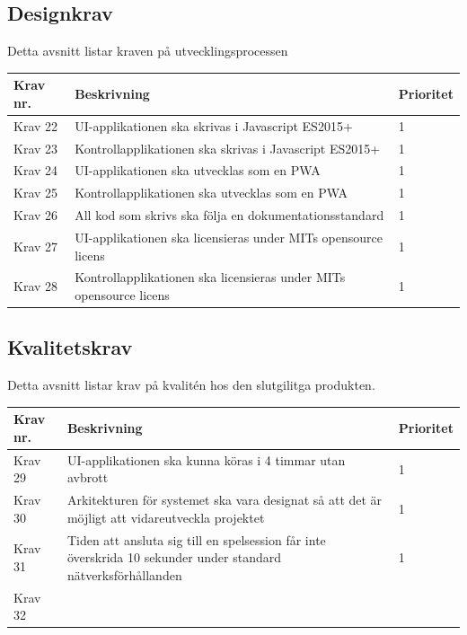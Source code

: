 \documentclass[10pt]{article}
\begin{document}
	\subsection{Designkrav}
	Detta avsnitt listar kraven på utvecklingsprocessen
	
	\begin{tabular}{| p{2cm} | p{8cm} | p{2cm}|}
		\hline
		\textbf{Krav nr.} & \textbf{Beskrivning} & \textbf{Prioritet} \\ \hline
		
		Krav 22 & UI-applikationen ska skrivas i Javascript ES2015+ & 1 \\ \hline
		Krav 23 & Kontrollapplikationen ska skrivas i Javascript ES2015+ & 1 \\ \hline
		Krav 24 & UI-applikationen ska utvecklas som en PWA & 1 \\ \hline
		Krav 25 & Kontrollapplikationen ska utvecklas som en PWA & 1 \\ \hline
		Krav 26 & All kod som skrivs ska följa en dokumentationsstandard & 1 \\ \hline
		Krav 27 & UI-applikationen ska licensieras under MITs opensource licens & 1 \\ \hline
		Krav 28 & Kontrollapplikationen ska licensieras under MITs opensource licens & 1 \\ \hline
	\end{tabular}

	\subsection{Kvalitetskrav}
	Detta avsnitt listar krav på kvalitén hos den slutgilitga produkten.
	
		\begin{tabular}{|p{2cm}|p{8cm}|p{2cm}|}
		\hline
		\textbf{Krav nr.} & \textbf{Beskrivning} & \textbf{Prioritet} \\ \hline
		Krav 29 & UI-applikationen ska kunna köras i 4 timmar utan avbrott & 1 \\ \hline
		Krav 30 & Arkitekturen för systemet ska vara designat så att det är möjligt att vidareutveckla projektet & 1 \\ \hline
		Krav 31 & Tiden att ansluta sig till en spelsession får inte överskrida 10 sekunder under standard nätverksförhållanden & 1 \\ \hline
		Krav 32 & & \\ \hline
		
	\end{tabular}
\end{document}
